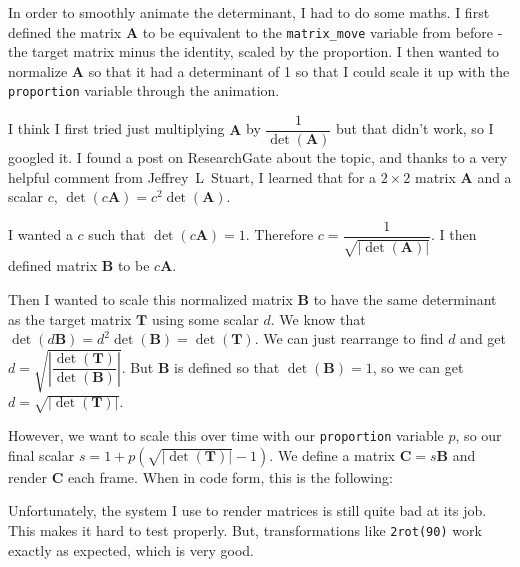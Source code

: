 \documentclass[../main.tex]{subfiles}
\begin{document}
In order to smoothly animate the determinant, I had to do some maths. I first defined the matrix $\mathbf{A}$ to be equivalent to the \texttt{matrix\_move} variable from before - the target matrix minus the identity, scaled by the proportion. I then wanted to normalize $\mathbf{A}$ so that it had a determinant of 1 so that I could scale it up with the \texttt{proportion} variable through the animation.

I think I first tried just multiplying $\mathbf{A}$ by $\dfrac{1}{\det(\mathbf{A})}$ but that didn't work, so I googled it. I found a post\cite{researchgate-normalize-determinant} on ResearchGate about the topic, and thanks to a very helpful comment from Jeffrey~L~Stuart, I learned that for a $2 \times 2$ matrix $\mathbf{A}$ and a scalar $c$, $\det(c \mathbf{A}) = c^2 \det(\mathbf{A})$.

I wanted a $c$ such that $\det(c \mathbf{A}) = 1$. Therefore $c = \dfrac{1}{\sqrt{|\det(\mathbf{A})|}}$. I then defined matrix $\mathbf{B}$ to be $c\mathbf{A}$.

Then I wanted to scale this normalized matrix $\mathbf{B}$ to have the same determinant as the target matrix $\mathbf{T}$ using some scalar $d$. We know that $\det(d \mathbf{B}) = d^2 \det(\mathbf{B}) = \det(\mathbf{T})$. We can just rearrange to find $d$ and get $d = \sqrt{\left|\dfrac{\det(\mathbf{T})}{\det(\mathbf{B})}\right|}$. But $\mathbf{B}$ is defined so that $\det(\mathbf{B}) = 1$, so we can get $d = \sqrt{|\det(\mathbf{T})|}$.

However, we want to scale this over time with our \texttt{proportion} variable $p$, so our final scalar $s = 1 + p \left(\sqrt{|\det(\mathbf{T})|} - 1\right)$. We define a matrix $\mathbf{C} = s \mathbf{B}$ and render $\mathbf{C}$ each frame. When in code form, this is the following:


Unfortunately, the system I use to render matrices is still quite bad at its job. This makes it hard to test properly. But, transformations like \texttt{2rot(90)} work exactly as expected, which is very good.
\end{document}
